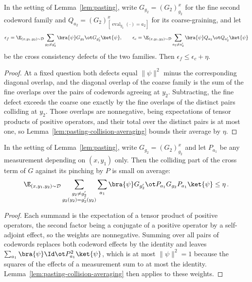 \begin{lemma}
	\label{lem:pasting-fine-coarse-cross}
	\leanok
	In the setting of Lemma~\ref{lem:pasting}, write $G_{g_2} = (G_2)^x_{g_2}$
	for the fine second codeword family and
	$Q_{a_2} = (G_2)^x_{[\operatorname{eval}_{y_2}(\cdot)=a_2]}$ for its
	coarse-graining, and let
	\[
		\epsilon_f = \E_{(x,y_1,y_2) \sim \mathcal D}
			\sum_{g_2 \ne g_2'} \bra{\psi} G_{g_2} \ot G_{g_2'} \ket{\psi},
		\qquad
		\epsilon_c = \E_{(x,y_1,y_2) \sim \mathcal D}
			\sum_{a_2 \ne a_2'} \bra{\psi} Q_{a_2} \ot Q_{a_2'} \ket{\psi}
	\]
	be the cross consistency defects of the two families. Then
	$\epsilon_f \le \epsilon_c + \eta$.
\end{lemma}
\begin{proof}
	\leanok
	At a fixed question both defects equal $\|\psi\|^2$ minus the corresponding
	diagonal overlap, and the diagonal overlap of the coarse family is the sum
	of the fine overlaps over the pairs of codewords agreeing at $y_2$.
	Subtracting, the fine defect exceeds the coarse one exactly by the fine
	overlaps of the distinct pairs colliding at $y_2$. Those overlaps are
	nonnegative, being expectations of tensor products of positive operators,
	and their total over the distinct pairs is at most one, so
	Lemma~\ref{lem:pasting-collision-averaging} bounds their average by $\eta$.
\end{proof}
\begin{lemma}
	\label{lem:pasting-pinched-collision}
	\leanok
	In the setting of Lemma~\ref{lem:pasting}, write $G_{g_2} = (G_2)^x_{g_2}$
	and let $P_{a_1}$ be any measurement depending on $(x, y_1)$ only. Then the
	colliding part of the cross term of $G$ against its pinching by $P$ is small
	on average:
	\[
		\E_{(x,y_1,y_2) \sim \mathcal D}
			\sum_{\substack{g_2 \ne g_2' \\ g_2(y_2) = g_2'(y_2)}}
				\sum_{a_1} \bra{\psi} G_{g_2'} \ot
					P_{a_1} G_{g_2} P_{a_1} \ket{\psi} \le \eta\,.
	\]
\end{lemma}
\begin{proof}
	\leanok
	Each summand is the expectation of a tensor product of positive operators,
	the second factor being a conjugate of a positive operator by a self-adjoint
	effect, so the weights are nonnegative. Summing over all pairs of codewords
	replaces both codeword effects by the identity and leaves
	$\sum_{a_1} \bra{\psi} \Id \ot P_{a_1}^2 \ket{\psi}$, which is at most
	$\|\psi\|^2 = 1$ because the squares of the effects of a measurement sum to
	at most the identity. Lemma~\ref{lem:pasting-collision-averaging} then
	applies to these weights.
\end{proof}


